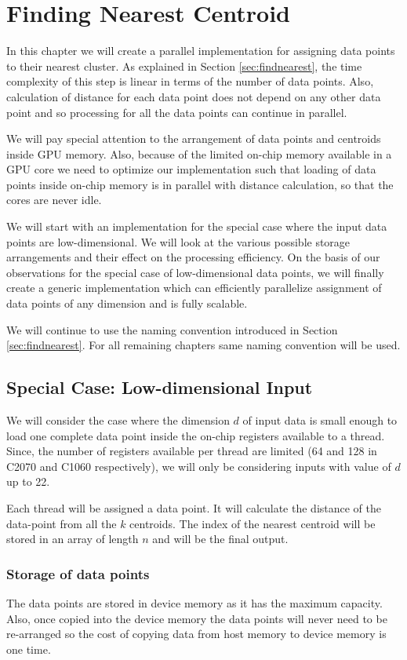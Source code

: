 \chapter{Finding Nearest Centroid}
In this chapter we will create a parallel implementation for assigning  data points to their nearest cluster. As explained in Section \ref{sec:findnearest}, the time complexity of this step is linear in terms of the number of data points. Also, calculation of distance for each data point does not depend on any other data point and so processing for all the data points can continue in parallel.

We will pay special attention to the arrangement of data points and centroids inside GPU memory. Also, because of the limited on-chip memory available in a GPU core we need to optimize our implementation such that loading of data points inside on-chip memory is in parallel with distance calculation, so that the cores are never idle.

We will start with an implementation for the special case where the input data points are low-dimensional. We will look at the various possible storage arrangements and their effect on the processing efficiency. On the basis of our observations for the special case of low-dimensional data points, we will finally create a generic implementation which can efficiently parallelize assignment of data points of any dimension and is fully scalable.

We will continue to use the naming convention introduced in Section \ref{sec:findnearest}. For all remaining chapters same naming convention will be used.

\section{Special Case: Low-dimensional Input}
We will consider the case where the dimension $d$ of input data is small enough to load one complete data point inside the on-chip registers available to a thread. Since, the number of registers available per thread are limited (64 and 128 in C2070 and C1060 respectively), we will only be considering inputs with value of $d$ up to 22.

Each thread will be assigned a data point. It will calculate the distance of the data-point from all the $k$ centroids. The index of the nearest centroid will be stored in an array of length $n$ and will be the final output.
\subsection{Storage of data points}\label{sec:dataStorage}
The data points are stored in device memory as it has the maximum capacity. Also, once copied into the device memory the data points will never need to be re-arranged so the cost of copying data from host memory to device memory is one time.

